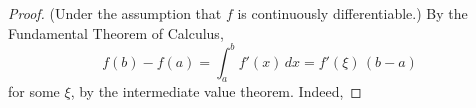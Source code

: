 

\begin{proof} (Under the assumption that $f$ is continuously differentiable.)
By the Fundamental Theorem of Calculus,
$$
f(b)-f(a) = \int_a^b f'(x)\,dx = f'(\xi)\,(b-a)
$$
for some $\xi$, by the intermediate value theorem. Indeed,

\end{proof}

